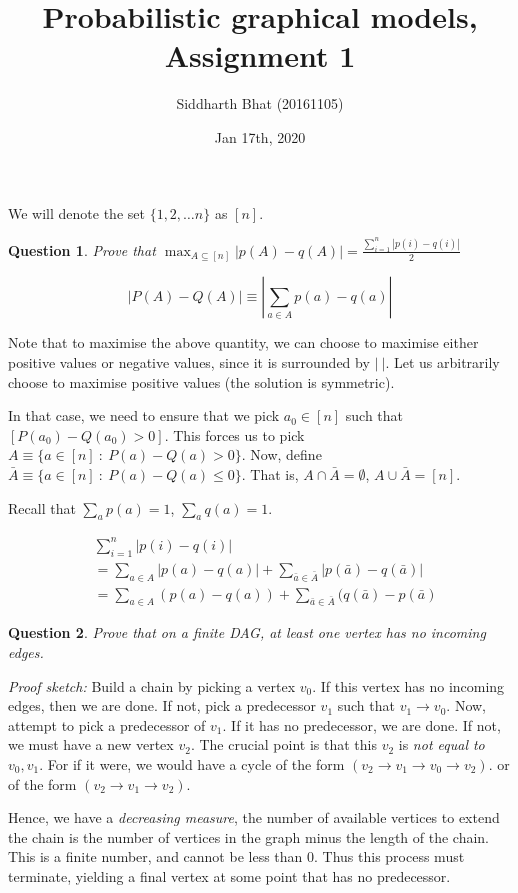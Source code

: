 \documentclass[11pt]{book}
\title{Probabilistic graphical models, Assignment 1}
\author{Siddharth Bhat (20161105)}
\date{Jan 17th, 2020}
\newtheorem{question}{Question}
\begin{document}
We will denote the set $\{1, 2, \dots n\}$ as $[n]$.


\begin{question}
Prove that $\max_{A \subseteq [n]} |p(A) - q(A)| = \frac{\sum_{i=1}^n  |p(i) - q(i)|}{2}$
\end{question}

$$
|P(A) - Q(A)| \equiv \left|\sum_{a \in A} p(a) - q(a)\right|
$$

Note that to maximise the above quantity, we can choose to maximise either
positive values or negative values, since it is surrounded by  $|~|$. Let us
arbitrarily choose to maximise positive values (the solution is symmetric).

In that case, we need to ensure that we pick $a_0 \in [n]$ such that $[P(a_0) - Q(a_0) > 0]$.
This forces us to pick $A \equiv \{ a \in [n]~:~ P(a)-Q(a) > 0 \}$.
Now, define $\bar A \equiv \{ a \in [n]~:~ P(a) - Q(a) \leq 0 \}$. That is,
$A \cap \bar A = \emptyset$, $A \cup \bar A = [n]$.

Recall that $\sum_a p(a) = 1$, $\sum_a q(a) = 1$.

\begin{align*}
&\sum_{i=1}^n|p(i) - q(i)| \\
&= \sum_{a \in A} |p(a) - q(a)| + \sum_{\bar a \in \bar A} |p(\bar a) - q(\bar a)| \\
&= \sum_{a \in A} (p(a) - q(a)) + \sum_{\bar a \in \bar A}  (q(\bar a) - p(\bar a)
\end{align*}

\begin{question}
    Prove that on a finite DAG, at least one vertex has no incoming edges.
\end{question}

\emph{Proof sketch:} Build a chain by picking a vertex $v_0$. If this vertex
has no incoming edges, then we are done. If not, pick a predecessor $v_1$
such that $v_1 \rightarrow v_0$. Now, attempt to pick a predecessor of $v_1$.
If it has no predecessor, we are done. If not, we must have a new vertex $v_2$.
The crucial point is that this $v_2$ is \emph{not equal to $v_0, v_1$}. For if
it were, we would have a cycle of the form $(v_2 \rightarrow v_1 \rightarrow v_0 \rightarrow v_2)$.
or of the form $(v_2 \rightarrow v_1 \rightarrow v_2)$.

Hence, we have a \emph{decreasing measure}, the number of available vertices to
extend the chain is the number of vertices in the graph minus the length
of the chain. This is a finite number, and cannot be less than 0. Thus this
process must terminate, yielding a final vertex at some point that has no
predecessor.
\end{document}

